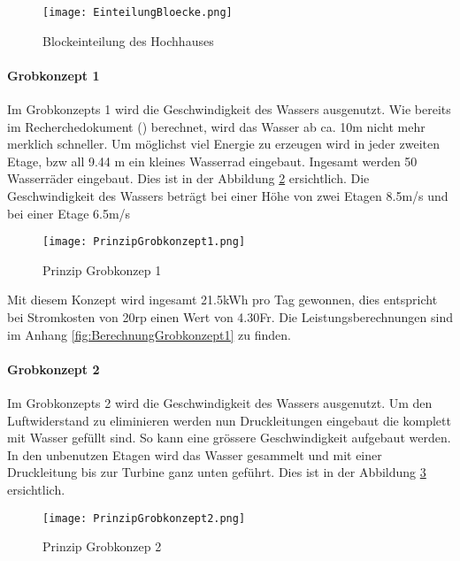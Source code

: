 \begin{figure} [H]
	\centering
	\texttt{[image: EinteilungBloecke.png]}
	\caption{Blockeinteilung des Hochhauses}
	\label{fig:EinteilungBloecke}
\end{figure}

\newpage

\paragraph{Grobkonzept 1} 

Im Grobkonzepts 1 wird die Geschwindigkeit des Wassers ausgenutzt. Wie bereits im Recherchedokument (\cite{recherchedokument}) berechnet, wird das Wasser ab ca. 10m nicht mehr merklich schneller. Um möglichst viel Energie zu erzeugen wird in jeder zweiten Etage, bzw all 9.44 \si{m} ein kleines Wasserrad eingebaut. Ingesamt werden 50 Wasserräder eingebaut. Dies ist in der Abbildung \ref{fig:PrinzipGrobkonzept1}  ersichtlich. Die Geschwindigkeit des Wassers beträgt bei einer Höhe von zwei Etagen 8.5\si{m/s} und bei einer Etage 6.5\si{m/s}

\begin{figure} [H]
	\centering
	\texttt{[image: PrinzipGrobkonzept1.png]}
	\caption{Prinzip Grobkonzep 1}
	\label{fig:PrinzipGrobkonzept1}
\end{figure}

Mit diesem Konzept wird ingesamt 21.5\si{kWh} pro Tag gewonnen, dies entspricht bei Stromkosten von 20\si{rp} einen Wert von 4.30\si{Fr}. Die Leistungsberechnungen sind im Anhang \ref{fig:BerechnungGrobkonzept1}  zu finden.

\newpage

\paragraph{Grobkonzept 2}

Im Grobkonzepts 2 wird die Geschwindigkeit des Wassers ausgenutzt. Um den Luftwiderstand zu eliminieren werden nun Druckleitungen eingebaut die komplett mit Wasser gefüllt sind. So kann eine grössere Geschwindigkeit aufgebaut werden. In den unbenutzen Etagen wird das Wasser gesammelt und mit einer Druckleitung bis zur Turbine ganz unten geführt. Dies ist in der Abbildung \ref{fig:PrinzipGrobkonzept2}  ersichtlich.

\begin{figure} [H]
	\centering
	\texttt{[image: PrinzipGrobkonzept2.png]}
	\caption{Prinzip Grobkonzep 2}
	\label{fig:PrinzipGrobkonzept2}
\end{figure}

